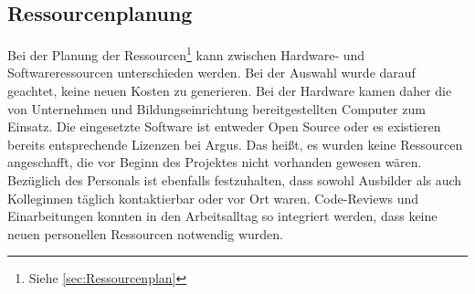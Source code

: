 \documentclass[11pt,toc=sectionentrywithoutdots, 
headheight=44pt, headings=optiontoheadandtoc, hyperfootnotes=false, hypertexnames=false]{scrartcl}
\newcommand\extendedref[1]{Siehe \ref{#1}}
\begin{document}
\subsection{Ressourcenplanung}
Bei der Planung der Ressourcen\footnote{\extendedref{sec:Ressourcenplan}} kann zwischen Hardware- und Softwareressourcen unterschieden werden. Bei der Auswahl wurde darauf geachtet, keine neuen Kosten zu generieren. Bei der Hardware kamen daher die von Unternehmen und Bildungseinrichtung bereitgestellten Computer zum Einsatz. Die eingesetzte Software ist entweder \gls{Open Source} oder es existieren bereits entsprechende Lizenzen bei Argus. Das heißt, es wurden keine Ressourcen angeschafft, die vor Beginn des Projektes nicht vorhanden gewesen wären. Bezüglich des Personals ist ebenfalls festzuhalten, dass sowohl Ausbilder als auch Kolleginnen täglich kontaktierbar oder vor Ort waren. Code-Reviews und Einarbeitungen konnten in den Arbeitsalltag so integriert werden, dass keine neuen personellen Ressourcen notwendig wurden.
\end{document}
